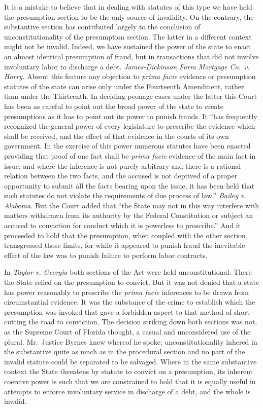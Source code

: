 \documentclass[
  letterpaper,
  11pt,
  DIV=9,
  openright]{scrbook}
\begin{document}
It is a mistake to believe that in dealing with statutes of this type we
have held the presumption section to be the only source of invalidity.
On the contrary, the substantive section has contributed largely to the
conclusion of unconstitutionality of the presumption section. The latter
in a different context might not be invalid. Indeed, we have sustained
the power of the state to enact an almost identical presumption of
fraud, but in transactions that did not involve involuntary labor to
discharge a debt. \emph{James-Dickinson Farm Mortgage Co.~v. Harry.}
Absent this feature any objection to \emph{prima facie} evidence or
presumption statutes of the state can arise only under the Fourteenth
Amendment, rather than under the Thirteenth. In deciding peonage cases
under the latter this Court has been as careful to point out the broad
power of the state to create presumptions as it has to point out its
power to punish frauds. It ``has frequently recognized the general power
of every legislature to prescribe the evidence which shall be received,
and the effect of that evidence in the courts of its own government. In
the exercise of this power numerous statutes have been enacted providing
that proof of one fact shall be \emph{prima facie} evidence of the main
fact in issue; and where the inference is not purely arbitrary and there
is a rational relation between the two facts, and the accused is not
deprived of a proper opportunity to submit all the facts bearing upon
the issue, it has been held that such statutes do not violate the
requirements of due process of law.'' \emph{Bailey v. Alabama.} But the
Court added that ``the State may not in this way interfere with matters
withdrawn from its authority by the Federal Constitution or subject an
accused to conviction for conduct which it is powerless to proscribe.''
And it proceeded to hold that the presumption, when coupled with the
other section, transgressed those limits, for while it appeared to
punish fraud the inevitable effect of the law was to punish failure to
perform labor contracts.

In \emph{Taylor v. Georgia} both sections of the Act were held
unconstitutional. There the State relied on the presumption to convict.
But it was not denied that a state has power reasonably to prescribe the
\emph{prima facie} inferences to be drawn from circumstantial evidence.
It was the substance of the crime to establish which the presumption was
invoked that gave a forbidden aspect to that method of short-cutting the
road to conviction. The decision striking down both sections was not, as
the Supreme Court of Florida thought, a casual and unconsidered use of
the plural. Mr.~Justice Byrnes knew whereof he spoke;
unconstitutionality inhered in the substantive quite as much as in the
procedural section and no part of the invalid statute could be separated
to be salvaged. Where in the same substantive context the State
threatens by statute to convict on a presumption, its inherent coercive
power is such that we are constrained to hold that it is equally useful
in attempts to enforce involuntary service in discharge of a debt, and
the whole is invalid.
\end{document}
